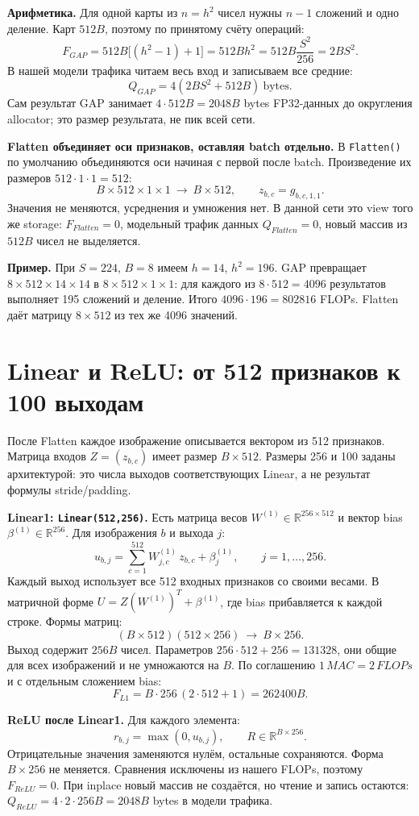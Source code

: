 \documentclass[11pt,a4paper]{article}
\newcommand{\page}[1]{\clearpage\section{#1}}
\begin{document}
\textbf{Арифметика.} Для одной карты из $n=h^2$ чисел нужны $n-1$ сложений
и одно деление. Карт $512B$, поэтому по принятому счёту операций:
\[
 F_{GAP}=512B\bigl[(h^2-1)+1\bigr]
 =512Bh^2=512B\frac{S^2}{256}=2BS^2.
\]
В нашей модели трафика читаем весь вход и записываем все средние:
\[
 Q_{GAP}=4(2BS^2+512B)\ \text{bytes}.
\]
Сам результат GAP занимает $4\cdot512B=2048B$ bytes FP32-данных
до округления allocator; это размер результата, не пик всей сети.

\textbf{Flatten объединяет оси признаков, оставляя batch отдельно.}
В \texttt{Flatten()} по умолчанию объединяются оси начиная с первой после
batch. Произведение их размеров $512\cdot1\cdot1=512$:
\[
 B\times512\times1\times1\ \longrightarrow\ B\times512,
 \qquad z_{b,c}=g_{b,c,1,1}.
\]
Значения не меняются, усреднения и умножения нет. В данной сети это view
того же storage: $F_{Flatten}=0$, модельный трафик данных $Q_{Flatten}=0$,
новый массив из $512B$ чисел не выделяется.

\textbf{Пример.} При $S=224$, $B=8$ имеем $h=14$, $h^2=196$.
GAP превращает $8\times512\times14\times14$ в $8\times512\times1\times1$:
для каждого из $8\cdot512=4096$ результатов выполняет 195 сложений и деление.
Итого $4096\cdot196=802816$ FLOPs. Flatten даёт матрицу $8\times512$
из тех же 4096 значений.

\page{Linear и ReLU: от 512 признаков к 100 выходам}
После Flatten каждое изображение описывается вектором из 512 признаков.
Матрица входов $Z=(z_{b,c})$ имеет размер $B\times512$.
Размеры 256 и 100 заданы архитектурой: это числа выходов соответствующих
Linear, а не результат формулы stride/padding.

\textbf{Linear1: \texttt{Linear(512,256)}.} Есть матрица весов
$W^{(1)}\in\mathbb R^{256\times512}$ и вектор bias
$\beta^{(1)}\in\mathbb R^{256}$. Для изображения $b$ и выхода $j$:
\[
 u_{b,j}=\sum_{c=1}^{512}W^{(1)}_{j,c}\,z_{b,c}+\beta^{(1)}_j,
 \qquad j=1,\ldots,256.
\]
Каждый выход использует все 512 входных признаков со своими весами.
В матричной форме $U=Z(W^{(1)})^T+\beta^{(1)}$, где bias прибавляется
к каждой строке. Формы матриц:
\[
 (B\times512)(512\times256)\ \longrightarrow\ B\times256.
\]
Выход содержит $256B$ чисел. Параметров $256\cdot512+256=131328$,
они общие для всех изображений и не умножаются на $B$.
По соглашению $1\,MAC=2\,FLOPs$ и с отдельным сложением bias:
\[
 F_{L1}=B\cdot256\,(2\cdot512+1)=262400B.
\]

\textbf{ReLU после Linear1.} Для каждого элемента:
\[
 r_{b,j}=\max(0,u_{b,j}),\qquad R\in\mathbb R^{B\times256}.
\]
Отрицательные значения заменяются нулём, остальные сохраняются.
Форма $B\times256$ не меняется. Сравнения исключены из нашего FLOPs,
поэтому $F_{ReLU}=0$. При inplace новый массив не создаётся, но чтение
и запись остаются: $Q_{ReLU}=4\cdot2\cdot256B=2048B$ bytes в модели трафика.
\end{document}
